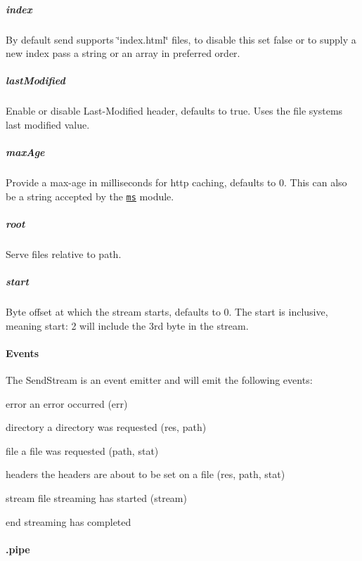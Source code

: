 \subparagraph*{index}

By default send supports \char`\"{}index.\+html\char`\"{} files, to disable this set {\ttfamily false} or to supply a new index pass a string or an array in preferred order.

\subparagraph*{last\+Modified}

Enable or disable {\ttfamily Last-\/\+Modified} header, defaults to true. Uses the file system\textquotesingle{}s last modified value.

\subparagraph*{max\+Age}

Provide a max-\/age in milliseconds for http caching, defaults to 0. This can also be a string accepted by the \href{https://www.npmjs.org/package/ms#readme}{\tt ms} module.

\subparagraph*{root}

Serve files relative to {\ttfamily path}.

\subparagraph*{start}

Byte offset at which the stream starts, defaults to 0. The start is inclusive, meaning {\ttfamily start\+: 2} will include the 3rd byte in the stream.

\paragraph*{Events}

The {\ttfamily Send\+Stream} is an event emitter and will emit the following events\+:


\begin{DoxyItemize}
\item {\ttfamily error} an error occurred {\ttfamily (err)}
\item {\ttfamily directory} a directory was requested {\ttfamily (res, path)}
\item {\ttfamily file} a file was requested {\ttfamily (path, stat)}
\item {\ttfamily headers} the headers are about to be set on a file {\ttfamily (res, path, stat)}
\item {\ttfamily stream} file streaming has started {\ttfamily (stream)}
\item {\ttfamily end} streaming has completed
\end{DoxyItemize}

\paragraph*{.pipe}

